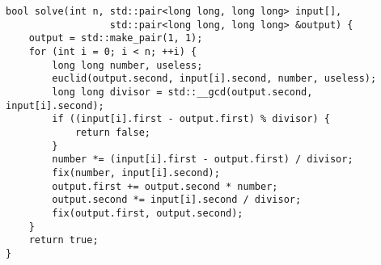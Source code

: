 \begin{lstlisting}
bool solve(int n, std::pair<long long, long long> input[],
                  std::pair<long long, long long> &output) {
    output = std::make_pair(1, 1);
    for (int i = 0; i < n; ++i) {
        long long number, useless;
        euclid(output.second, input[i].second, number, useless);
        long long divisor = std::__gcd(output.second, input[i].second);
        if ((input[i].first - output.first) % divisor) {
            return false;
        }
        number *= (input[i].first - output.first) / divisor;
        fix(number, input[i].second);
        output.first += output.second * number;
        output.second *= input[i].second / divisor;
        fix(output.first, output.second);
    }
    return true;
}
\end{lstlisting}
